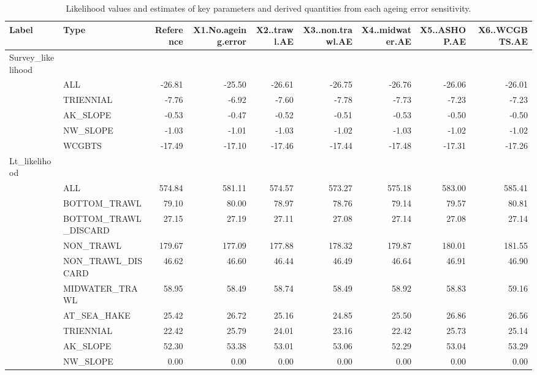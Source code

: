 \documentclass[
]{scrartcl}
\begin{document}
\newpage{}

\begin{landscape}
\begingroup
\fontsize{9.0pt}{10.8pt}\selectfont

\begin{longtable}{llrrrrrrr}

\caption{\label{tbl-sensitivities-age-error}Likelihood values and
estimates of key parameters and derived quantities from each ageing
error sensitivity.}

\tabularnewline

\toprule
Label & Type & Reference & X1.No.ageing.error & X2..trawl.AE & X3..non.trawl.AE & X4..midwater.AE & X5..ASHOP.AE & X6..WCGBTS.AE \\ 
\midrule\addlinespace[2.5pt]
Survey\_likelihood &  &  &  &  &  &  &  &  \\ 
 & ALL & -26.81 & -25.50 & -26.61 & -26.75 & -26.76 & -26.06 & -26.01 \\ 
 & TRIENNIAL & -7.76 & -6.92 & -7.60 & -7.78 & -7.73 & -7.23 & -7.23 \\ 
 & AK\_SLOPE & -0.53 & -0.47 & -0.52 & -0.51 & -0.53 & -0.50 & -0.50 \\ 
 & NW\_SLOPE & -1.03 & -1.01 & -1.03 & -1.02 & -1.03 & -1.02 & -1.02 \\ 
 & WCGBTS & -17.49 & -17.10 & -17.46 & -17.44 & -17.48 & -17.31 & -17.26 \\ 
Lt\_likelihood &  &  &  &  &  &  &  &  \\ 
 & ALL & 574.84 & 581.11 & 574.57 & 573.27 & 575.18 & 583.00 & 585.41 \\ 
 & BOTTOM\_TRAWL & 79.10 & 80.00 & 78.97 & 78.76 & 79.14 & 79.57 & 80.81 \\ 
 & BOTTOM\_TRAWL\_DISCARD & 27.15 & 27.19 & 27.11 & 27.08 & 27.14 & 27.08 & 27.14 \\ 
 & NON\_TRAWL & 179.67 & 177.09 & 177.88 & 178.32 & 179.87 & 180.01 & 181.55 \\ 
 & NON\_TRAWL\_DISCARD & 46.62 & 46.60 & 46.44 & 46.49 & 46.64 & 46.91 & 46.90 \\ 
 & MIDWATER\_TRAWL & 58.95 & 58.49 & 58.74 & 58.49 & 58.92 & 58.83 & 59.16 \\ 
 & AT\_SEA\_HAKE & 25.42 & 26.72 & 25.16 & 24.85 & 25.50 & 26.86 & 26.56 \\ 
 & TRIENNIAL & 22.42 & 25.79 & 24.01 & 23.16 & 22.42 & 25.73 & 25.14 \\ 
 & AK\_SLOPE & 52.30 & 53.38 & 53.01 & 53.06 & 52.29 & 53.04 & 53.29 \\ 
 & NW\_SLOPE & 0.00 & 0.00 & 0.00 & 0.00 & 0.00 & 0.00 & 0.00 \\ 

\end{longtable}
\end{landscape}
\end{document}
